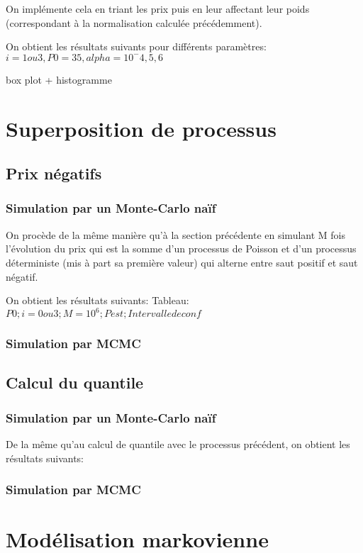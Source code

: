 \documentclass[a4paper,11pt]{article}
\begin{document}
On implémente cela en triant les prix puis en leur affectant leur poids (correspondant à la normalisation calculée précédemment).

On obtient les résultats suivants pour différents paramètres:
$i=1 ou 3, P0=35, alpha=10^-4, 5, 6$

box plot + histogramme


\section{Superposition de processus}

\subsection{Prix négatifs}

\subsubsection{Simulation par un Monte-Carlo naïf}
On procède de la même manière qu'à la section précédente en simulant M fois l'évolution du prix qui est la somme d'un processus de Poisson et d'un processus déterministe (mis à part sa première valeur) qui alterne entre saut positif et saut négatif. 

On obtient les résultats suivants:
Tableau: $P0; i=0 ou 3 ;M=10^6; Pest; Intervalle de conf$

\subsubsection{Simulation par MCMC}

\subsection{Calcul du quantile}

\subsubsection{Simulation par un Monte-Carlo naïf}
De la même qu'au calcul de quantile avec le processus précédent, on obtient les résultats suivants:

\subsubsection{Simulation par MCMC}

\section{Modélisation markovienne}
\end{document}
